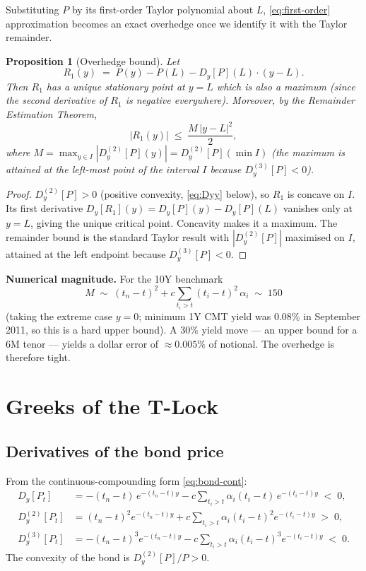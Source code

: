 \documentclass[11pt]{article}
\newtheorem{proposition}{Proposition}
\theoremstyle{definition}
\newcommand{\Tlock}{T-Lock}
\newcommand{\dDy}[1]{D_{y}^{(#1)}}              %
\begin{document}
Substituting $P$ by its first-order Taylor polynomial about $L$,
\cref{eq:first-order} approximation becomes an exact overhedge once
we identify it with the Taylor remainder.

\begin{proposition}[Overhedge bound]\label{prop:overhedge}
Let
\[
R_1(y) \;=\; P(y) - P(L) - D_y[P](L)\cdot(y-L).
\]
Then $R_1$ has a unique stationary point at $y=L$ which is also a
maximum (since the second derivative of $R_1$ is negative everywhere).
Moreover, by the Remainder Estimation Theorem,
\begin{equation}
|R_1(y)| \;\le\; \frac{M\,|y - L|^2}{2},
\label{eq:rem-bound}
\end{equation}
where $M = \max_{y\in I} |\dDy{2}[P](y)| = \dDy{2}[P](\min I)$ (the maximum
is attained at the left-most point of the interval $I$ because
$\dDy{3}[P] < 0$).
\end{proposition}

\begin{proof}
$\dDy{2}[P]>0$ (positive convexity, \cref{eq:Dyy} below), so $R_1$ is
concave on $I$. Its first derivative
$D_y[R_1](y) = D_y[P](y) - D_y[P](L)$
vanishes only at $y=L$, giving the unique critical point.
Concavity makes it a maximum. The remainder bound is the standard
Taylor result with $|D_y^{(2)}[P]|$ maximised on $I$, attained at the
left endpoint because $D_y^{(3)}[P]<0$.
\end{proof}

\textbf{Numerical magnitude.} For the 10Y benchmark
\[
M \;\sim\; (t_n - t)^2 + c\sum_{t_i>t}(t_i-t)^2\,\alpha_i \;\sim\; 150
\]
(taking the extreme case $y=0$; minimum 1Y CMT yield was 0.08\% in
September 2011, so this is a hard upper bound). A 30\% yield move ---
an upper bound for a 6M tenor --- yields a dollar error of
$\approx 0.005\%$ of notional. The overhedge is therefore tight.


\section{Greeks of the \Tlock}\label{sec:greeks}

\subsection{Derivatives of the bond price}\label{sec:bond-derivs}

From the continuous-compounding form \cref{eq:bond-cont}:
\begin{align}
D_y[P_t]   &= -(t_n-t)\,e^{-(t_n-t)y}
              - c\sum_{t_i>t}\alpha_i(t_i-t)\,e^{-(t_i-t)y}
              \;<\;0,
              \label{eq:Dy}\\[2pt]
\dDy{2}[P_t]&= (t_n-t)^2 e^{-(t_n-t)y}
              + c\sum_{t_i>t}\alpha_i(t_i-t)^2 e^{-(t_i-t)y}
              \;>\;0,
              \label{eq:Dyy}\\[2pt]
\dDy{3}[P_t]&= -(t_n-t)^3 e^{-(t_n-t)y}
              - c\sum_{t_i>t}\alpha_i(t_i-t)^3 e^{-(t_i-t)y}
              \;<\;0.
              \label{eq:Dyyy}
\end{align}
The convexity of the bond is $\dDy{2}[P]/P > 0$.
\end{document}
